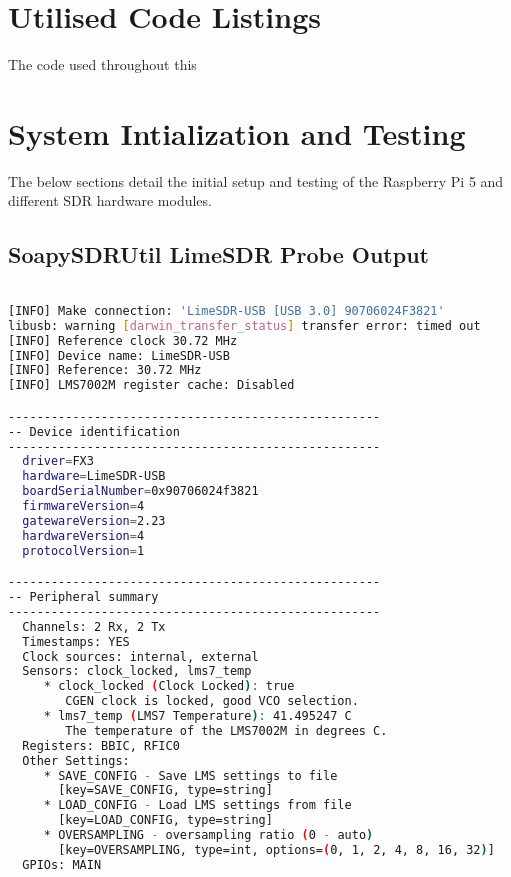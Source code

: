 \begin{appendices}
\cleardoublepage

\chapter{Utilised Code Listings}

The code used throughout this 

\chapter{System Intialization and Testing}

The below sections detail the initial setup and testing of the Raspberry Pi 5 and different SDR hardware modules.

\section{SoapySDRUtil LimeSDR Probe Output}
\begin{lstlisting}[language=bash, caption={SoapySDRUtil Probe Output for LimeSDR}, label={lst: soapyProbe}]

[INFO] Make connection: 'LimeSDR-USB [USB 3.0] 90706024F3821'
libusb: warning [darwin_transfer_status] transfer error: timed out
[INFO] Reference clock 30.72 MHz
[INFO] Device name: LimeSDR-USB
[INFO] Reference: 30.72 MHz
[INFO] LMS7002M register cache: Disabled

----------------------------------------------------
-- Device identification
----------------------------------------------------
  driver=FX3
  hardware=LimeSDR-USB
  boardSerialNumber=0x90706024f3821
  firmwareVersion=4
  gatewareVersion=2.23
  hardwareVersion=4
  protocolVersion=1

----------------------------------------------------
-- Peripheral summary
----------------------------------------------------
  Channels: 2 Rx, 2 Tx
  Timestamps: YES
  Clock sources: internal, external
  Sensors: clock_locked, lms7_temp
     * clock_locked (Clock Locked): true
        CGEN clock is locked, good VCO selection.
     * lms7_temp (LMS7 Temperature): 41.495247 C
        The temperature of the LMS7002M in degrees C.
  Registers: BBIC, RFIC0
  Other Settings:
     * SAVE_CONFIG - Save LMS settings to file
       [key=SAVE_CONFIG, type=string]
     * LOAD_CONFIG - Load LMS settings from file
       [key=LOAD_CONFIG, type=string]
     * OVERSAMPLING - oversampling ratio (0 - auto)
       [key=OVERSAMPLING, type=int, options=(0, 1, 2, 4, 8, 16, 32)]
  GPIOs: MAIN


\end{lstlisting}
\end{appendices}
